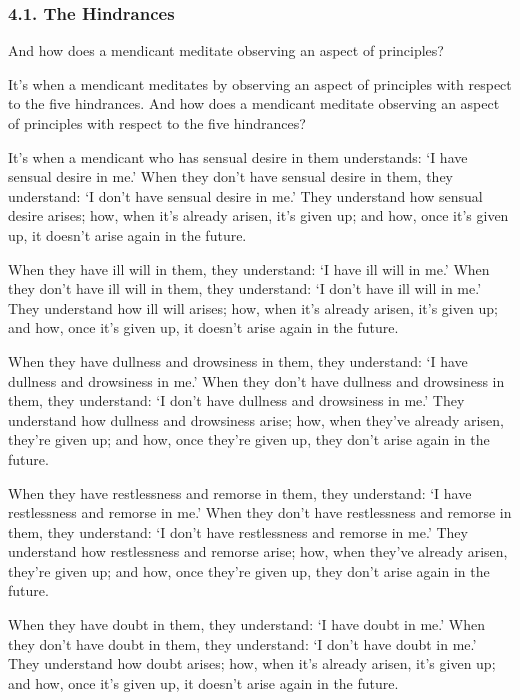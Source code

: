 \documentclass[12pt,openany]{book}%
\begin{document}
\subsubsection*{4.1. The Hindrances }

And how does a mendicant meditate observing an aspect of principles? 

It’s when a mendicant meditates by observing an aspect of principles with respect to the five hindrances. And how does a mendicant meditate observing an aspect of principles with respect to the five hindrances? 

It’s when a mendicant who has sensual desire in them understands: ‘I have sensual desire in me.’ When they don’t have sensual desire in them, they understand: ‘I don’t have sensual desire in me.’ They understand how sensual desire arises; how, when it’s already arisen, it’s given up; and how, once it’s given up, it doesn’t arise again in the future. 

When they have ill will in them, they understand: ‘I have ill will in me.’ When they don’t have ill will in them, they understand: ‘I don’t have ill will in me.’ They understand how ill will arises; how, when it’s already arisen, it’s given up; and how, once it’s given up, it doesn’t arise again in the future. 

When they have dullness and drowsiness in them, they understand: ‘I have dullness and drowsiness in me.’ When they don’t have dullness and drowsiness in them, they understand: ‘I don’t have dullness and drowsiness in me.’ They understand how dullness and drowsiness arise; how, when they’ve already arisen, they’re given up; and how, once they’re given up, they don’t arise again in the future. 

When they have restlessness and remorse in them, they understand: ‘I have restlessness and remorse in me.’ When they don’t have restlessness and remorse in them, they understand: ‘I don’t have restlessness and remorse in me.’ They understand how restlessness and remorse arise; how, when they’ve already arisen, they’re given up; and how, once they’re given up, they don’t arise again in the future. 

When they have doubt in them, they understand: ‘I have doubt in me.’ When they don’t have doubt in them, they understand: ‘I don’t have doubt in me.’ They understand how doubt arises; how, when it’s already arisen, it’s given up; and how, once it’s given up, it doesn’t arise again in the future. 
\end{document}
